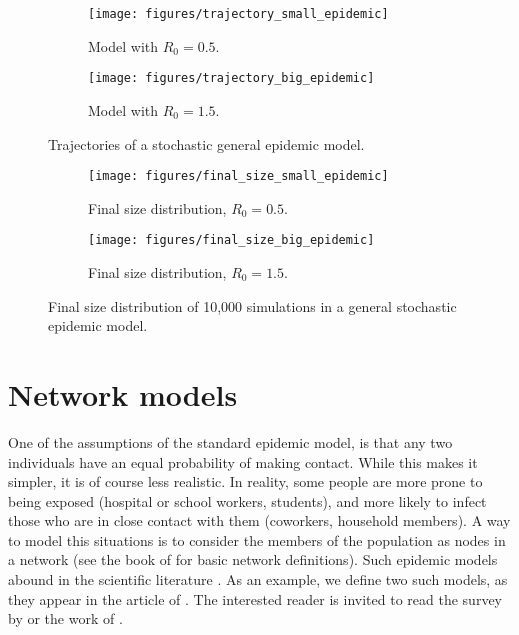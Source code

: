 \documentclass[aap]{imsart}
\theoremstyle{remark}
\begin{document}
\begin{figure}
	\centering
	\begin{subfigure}{0.45\linewidth}
		\texttt{[image: figures/trajectory\_small\_epidemic]}
		\caption{Model with $R_0 = 0.5$.}
		\label{fig:trajectory_small_epidemic}
	\end{subfigure}
	\hfill
	\begin{subfigure}{0.45\linewidth}
		\texttt{[image: figures/trajectory\_big\_epidemic]}
		\caption{Model with $R_0 = 1.5$.}
		\label{fig:trajectory_big_epidemic}
	\end{subfigure}
	\caption{Trajectories of a stochastic general epidemic model.} 
	\label{fig:trajectories}
\end{figure}

\begin{figure}
	\centering
	\begin{subfigure}{0.45\linewidth}
		\texttt{[image: figures/final\_size\_small\_epidemic]}
		\caption{Final size distribution, $R_0 = 0.5$.}
		\label{fig:final_size_small_epidemic}
	\end{subfigure}
	\hfill
	\begin{subfigure}{0.45\linewidth}
		\texttt{[image: figures/final\_size\_big\_epidemic]}
		\caption{Final size distribution, $R_0 = 1.5$.}
		\label{fig:final_size_big_epidemic}
	\end{subfigure}
	\caption{Final size distribution of 10,000 simulations in a general stochastic epidemic model.} 
	\label{fig:final_size}
\end{figure}

\section{Network models}\label{sect:network}
One of the assumptions of the standard epidemic model, is that any two individuals have an equal probability of making contact. While this makes it simpler, it is of course less realistic. In reality, some people are more prone to being exposed (hospital or school workers, students), and more likely to infect those who are in close contact with them (coworkers, household members). A way to model this situations is to consider the members of the population as nodes in a network (see the book of \citet{Newman_2018} for basic network definitions). Such epidemic models abound in the scientific literature \citep{Deijfen_2011, Fransson_Trapman_2019, Kiss_Miller_Simon_2017, Pastor-Satorras-survey}. As an example, we define two such models, as they appear in the article of \citet{Britton_2019}. The interested reader is invited to read the survey by \citet{Pastor-Satorras-survey} or the work of \citet{Britton_2019}.
\end{document}
